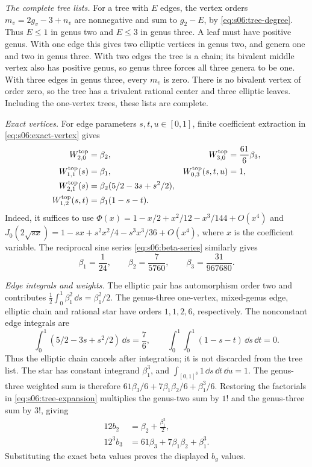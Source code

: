 \begin{prf}
\emph{The complete tree lists.}
For a tree with $E$ edges, the vertex orders
$m_v=2g_v-3+n_v$ are nonnegative and sum to $g_2-E$,
by \eqref{eq:s06:tree-degree}. Thus $E\leq1$ in genus two
and $E\leq3$ in genus three. A leaf must have positive genus.
With one edge this gives two elliptic vertices in genus two,
and genera one and two in genus three. With two edges the tree
is a chain; its bivalent middle vertex also has positive genus,
so genus three forces all three genera to be one. With three
edges in genus three, every $m_v$ is zero. There is no bivalent
vertex of order zero, so the tree has a trivalent rational center
and three elliptic leaves. Including the one-vertex trees,
these lists are complete.

\smallskip\noindent
\emph{Exact vertices.}
For edge parameters $s,t,u\in[0,1]$, finite coefficient extraction
in \eqref{eq:s06:exact-vertex} gives
\begin{equation}\label{eq:c:vertices}
 \begin{aligned}
 W^{\rm top}_{2,0}&=\beta_2,&
 W^{\rm top}_{3,0}&=\frac{61}{6}\beta_3,\\
 W^{\rm top}_{1,1}(s)&=\beta_1,&
 W^{\rm top}_{0,3}(s,t,u)&=1,\\
 W^{\rm top}_{2,1}(s)&=\beta_2(5/2-3s+s^2/2),\\
 W^{\rm top}_{1,2}(s,t)&=\beta_1(1-s-t).
 \end{aligned}
\end{equation}
Indeed, it suffices to use
$\Phi(x)=1-x/2+x^2/12-x^3/144+O(x^4)$ and
$J_0(2\sqrt{sx})=1-sx+s^2x^2/4-s^3x^3/36+O(x^4)$,
where $x$ is the coefficient variable. The reciprocal sine
series \eqref{eq:s06:beta-series} similarly gives
\[
 \beta_1=\frac1{24},\qquad
 \beta_2=\frac7{5760},\qquad
 \beta_3=\frac{31}{967680}.
\]

\smallskip\noindent
\emph{Edge integrals and weights.}
The elliptic pair has automorphism order two and contributes
$\frac12\int_0^1\beta_1^2\,\dd s=\beta_1^2/2$. The genus-three
one-vertex, mixed-genus edge, elliptic chain and rational star
have orders $1,1,2,6$, respectively. The nonconstant edge
integrals are
\[
 \int_0^1(5/2-3s+s^2/2)\,\dd s=\frac76,\qquad
 \int_0^1\int_0^1(1-s-t)\,\dd s\,\dd t=0.
\]
Thus the elliptic chain cancels after integration; it is not
discarded from the tree list. The star has constant integrand
$\beta_1^3$, and $\int_{[0,1]^3}1\,\dd s\,\dd t\,\dd u=1$.
The genus-three weighted sum is therefore
$61\beta_3/6+7\beta_1\beta_2/6+\beta_1^3/6$.
Restoring the factorials in \eqref{eq:s06:tree-expansion}
multiplies the genus-two sum by $1!$ and the genus-three sum by
$3!$, giving
\begin{equation}\label{eq:c:tree-values}
 \begin{aligned}
 12b_2&=\beta_2+\frac{\beta_1^2}{2},\\
 12^3b_3&=61\beta_3+7\beta_1\beta_2+\beta_1^3.
 \end{aligned}
\end{equation}
Substituting the exact beta values proves the displayed $b_g$ values.


\end{prf}
